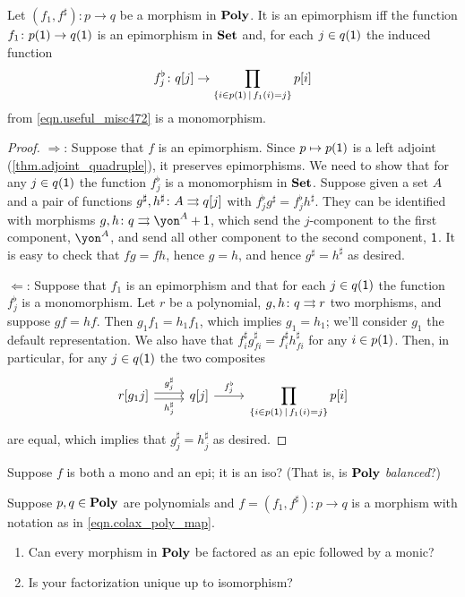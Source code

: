 \documentclass[DynamicalBook]{subfiles}
\begin{document}
\begin{proposition}\label{prop.epis_in_poly}
Let $(f_1,f^\sharp)\colon p\to q$ be a morphism in $\textbf{Poly}$. It is an epimorphism iff the function $f_1\colon p(\textsf{1})\to q(\textsf{1})$ is an epimorphism in $\textbf{Set}$ and, for each $j\in q(\textsf{1})$ the induced function 
\[
f^\flat_j\colon q[j]\to\prod_{\{i\in p(\textsf{1})\,\mid\, f_1(i)=j\}}p[i]
\]
from \eqref{eqn.useful_misc472} is a monomorphism.
\end{proposition}
\begin{proof}
\noindent$\Rightarrow$: Suppose that $f$ is an epimorphism. Since $p\mapsto p(\textsf{1})$ is a left adjoint (\cref{thm.adjoint_quadruple}), it preserves epimorphisms. We need to show that for any $j\in q(\textsf{1})$ the  function $f^\flat_j$ is a monomorphism in $\textbf{Set}$. Suppose given a set $A$ and a pair of functions $g^\sharp,h^\sharp\colon A\rightrightarrows q[j]$ with $f^\flat_jg^\sharp=f^\flat_jh^\sharp$. They can be identified with morphisms $g,h\colon q\tto \yon^A+\1$, which send the $j$-component to the first component, $\yon^A$, and send all other component to the second component, $\textsf{1}$. It is easy to check that $fg=fh$, hence $g=h$, and hence $g^\sharp=h^\sharp$ as desired.

\noindent$\Leftarrow$: Suppose that $f_1$ is an epimorphism and that for each $j\in q(\textsf{1})$ the function $f^\flat_j$ is a monomorphism. Let $r$ be a polynomial, $g,h\colon q\rightrightarrows r$ two morphisms, and suppose $gf=hf$. Then $g_1f_1=h_1f_1$, which implies $g_1=h_1$; we'll consider $g_1$ the default representation. We also have that $f^\sharp_ig^\sharp_{fi}=f^\sharp_ih^\sharp_{fi}$ for any $i\in p(\textsf{1})$. Then, in particular, for any $j\in q(\textsf{1})$ the two composites
\[
\begin{tikzcd}
	r[g_1j]\ar[r, shift left, "g^\sharp_j"]\ar[r, shift right, "h^\sharp_j"']&q[j]\ar[r, "f^\flat_j"]&\displaystyle\prod_{\{i\in p(\1)\,\mid\,f_1(i)=j\}}p[i]
\end{tikzcd}
\]
are equal, which implies that $g^\sharp_j=h^\sharp_j$ as desired.
\end{proof}

\begin{exercise}
Suppose $f$ is both a mono and an epi; it is an iso? (That is, is $\textbf{Poly}$ \emph{balanced}?)
\end{exercise}

\begin{exercise}\label{exc.mono_epi_poly}
Suppose $p,q\in\textbf{Poly}$ are polynomials and $f=(f_1,f^\sharp)\colon p\to q$ is a morphism with notation as in \cref{eqn.colax_poly_map}.
\begin{enumerate}
	\item Can every morphism in $\textbf{Poly}$ be factored as an epic followed by a monic?
	\item Is your factorization unique up to isomorphism?
\qedhere
\end{enumerate}
\end{exercise}
\end{document}
